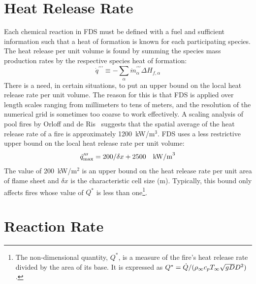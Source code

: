 \section{Heat Release Rate}

Each chemical reaction in FDS must be defined with a fuel and sufficient information such that a heat of formation is known for each participating species. The heat release per unit volume is found by summing the species mass production rates by the respective species heat of formation:
\begin{equation}\label{eq:vol_heat_gen}
\dot{q}^{\prime\prime\prime} \equiv -\displaystyle \sum_{\alpha} \dot{m}^{\prime\prime\prime}_{\alpha} \Delta H_{f,\alpha}
\end{equation}
There is a need, in certain situations, to put an upper bound on the local heat release rate per unit volume. The reason for
this is that FDS is applied over length scales ranging from millimeters to tens of meters, and the resolution of the numerical grid
is sometimes too coarse to work effectively.
A scaling analysis of pool fires by Orloff and de Ris~\cite{Orloff:19th_Symposium} suggests that the spatial average of the
heat release rate of a fire is approximately 1200~kW/m$^3$. FDS uses a less restrictive upper bound on the local heat release rate per unit volume:
\begin{equation}\label{eq:q_bound} 
\dot{q}_{\max}''' = 200/\delta x + 2500 \quad \hbox{kW/m}^3 
\end{equation}
The value of 200~kW/m$^2$ is an upper bound on the heat release rate per unit area of flame sheet and $\delta x$ is the characteristic cell size (m). Typically, this bound only affects fires whose value of $Q^*$ is less than one\footnote{The non-dimensional quantity, $Q^*$, is a measure of the fire's heat release rate divided by the
area of its base. It is expressed as $Q^*=\dot{Q}/(\rho_\infty c_p T_\infty \sqrt{g D} D^2)$.}.

\section{Reaction Rate} 

\label{Reaction_Rate_Model}

